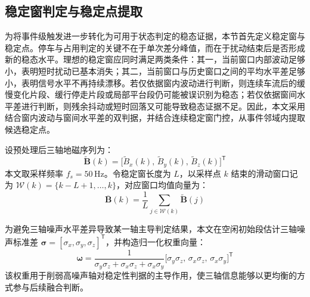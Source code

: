 \documentclass{xdupgthesis}
\begin{document}
\subsection{稳定窗判定与稳定点提取}
\label{subsec:ch4_stable}

为将事件级触发进一步转化为可用于状态判定的稳态证据，本节首先定义稳定窗与稳定点。停车与占用判定的关键不在于单次差分峰值，而在于扰动结束后是否形成新的稳态水平。理想的稳定窗应同时满足两类条件：其一，当前窗口内部波动足够小，表明短时扰动已基本消失；其二，当前窗口与历史窗口之间的平均水平差足够小，表明信号水平不再持续漂移。若仅依据窗内波动进行判断，则连续车流后的缓慢变化片段、缓行停走片段或局部平台段仍可能被误识别为稳态；若仅依据窗间水平差进行判断，则残余抖动或短时回落又可能导致稳态证据不足。因此，本文采用结合窗内波动与窗间水平差的双判据，并结合连续稳定窗门控，从事件邻域内提取候选稳定点。

设预处理后三轴地磁序列为：
\begin{equation}
    \widetilde{\mathbf{B}}(k)=\big[\widetilde{B}_x(k),\,\widetilde{B}_y(k),\,\widetilde{B}_z(k)\big]^{\mathsf{T}}
\end{equation}
本文取采样频率 $f_s=50\,\mathrm{Hz}$。令稳定窗长度为 $L$，以采样点 $k$ 结束的滑动窗口记为 $\mathcal{W}(k)=\{k-L+1,\ldots,k\}$，对应窗口均值向量为：
\begin{equation}
    \overline{\mathbf{B}}(k)=\frac{1}{L}\sum_{j\in\mathcal{W}(k)}\widetilde{\mathbf{B}}(j)
\end{equation}

为避免三轴噪声水平差异导致某一轴主导判定结果，本文在空闲初始段估计三轴噪声标准差 $\boldsymbol{\sigma}=[\sigma_x,\sigma_y,\sigma_z]^{\mathsf{T}}$，并构造归一化权重向量：
\begin{equation}
    \boldsymbol{\omega}=\frac{1}{\sigma_y\sigma_z+\sigma_x\sigma_z+\sigma_x\sigma_y}
    \big[\sigma_y\sigma_z,\,\sigma_x\sigma_z,\,\sigma_x\sigma_y\big]^{\mathsf{T}}
\end{equation}
该权重用于削弱高噪声轴对稳定性判据的主导作用，使三轴信息能够以更均衡的方式参与后续融合判断。
\end{document}
